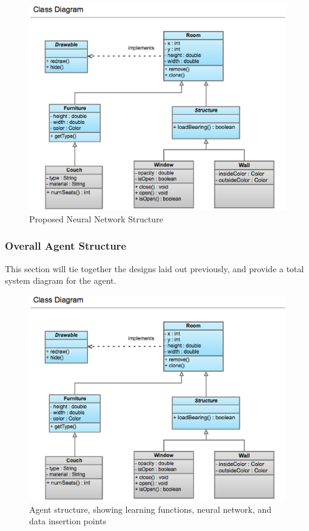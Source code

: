 \documentclass[draftclsnofoot,onecolumn,letterpaper,10pt]{IEEEtran}
\begin{document}
\begin{figure}\label{fig:nn}
\begin{center}
	\caption{Proposed Neural Network Structure}
	\includegraphics[scale=0.3]{tmp.eps}
\end{center}
\end{figure}

\subsubsection{Overall Agent Structure}
This section will tie together the designs laid out previously, and provide a total system diagram for the agent.

\begin{figure}\label{fig:AgentStructure}
\begin{center}
	\caption{Agent structure, showing learning functions, neural network, and data insertion points}
	\includegraphics[scale=0.3]{tmp.eps}
\end{center}
\end{figure}
\end{document}
